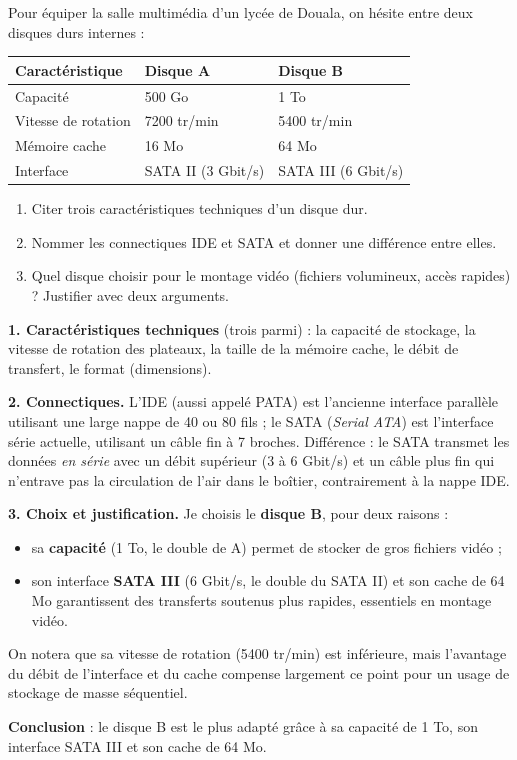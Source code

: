 \documentclass[11pt]{article}
\newcommand{\cle}[1]{{\popxbold\color{popdark}#1}}
\begin{document}
\begin{exoresolu}
Pour équiper la salle multimédia d'un lycée de Douala, on hésite entre deux disques durs internes :
\begin{center}
\begin{tabularx}{\linewidth}{|l|X|X|}
\hline
\rowcolor{popblueL} \textbf{Caractéristique} & \textbf{Disque A} & \textbf{Disque B} \\
\hline
Capacité & 500 Go & 1 To \\
\hline
Vitesse de rotation & \num{7200} tr/min & \num{5400} tr/min \\
\hline
Mémoire cache & 16 Mo & 64 Mo \\
\hline
Interface & SATA II (3 Gbit/s) & SATA III (6 Gbit/s) \\
\hline
\end{tabularx}
\end{center}
\begin{enumerate}
\item Citer trois caractéristiques techniques d'un disque dur.
\item Nommer les connectiques IDE et SATA et donner une différence entre elles.
\item Quel disque choisir pour le montage vidéo (fichiers volumineux, accès rapides) ? Justifier avec deux arguments.
\end{enumerate}
\tcblower
\textbf{1. Caractéristiques techniques} (trois parmi) : la capacité de stockage, la vitesse de rotation des plateaux, la taille de la mémoire cache, le débit de transfert, le format (dimensions).

\textbf{2. Connectiques.} L'\cle{IDE} (aussi appelé PATA) est l'ancienne interface parallèle utilisant une large nappe de 40 ou 80 fils ; le \cle{SATA} (\emph{Serial ATA}) est l'interface série actuelle, utilisant un câble fin à 7 broches. Différence : le SATA transmet les données \emph{en série} avec un débit supérieur (3 à 6 Gbit/s) et un câble plus fin qui n'entrave pas la circulation de l'air dans le boîtier, contrairement à la nappe IDE.

\textbf{3. Choix et justification.} Je choisis le \textbf{disque B}, pour deux raisons :
\begin{itemize}
\item sa \textbf{capacité} (1 To, le double de A) permet de stocker de gros fichiers vidéo ;
\item son interface \textbf{SATA III} (6 Gbit/s, le double du SATA II) et son cache de 64 Mo garantissent des transferts soutenus plus rapides, essentiels en montage vidéo.
\end{itemize}
On notera que sa vitesse de rotation (\num{5400} tr/min) est inférieure, mais l'avantage du débit de l'interface et du cache compense largement ce point pour un usage de stockage de masse séquentiel.

\textbf{Conclusion} : le disque B est le plus adapté grâce à sa capacité de 1 To, son interface SATA III et son cache de 64 Mo.
\end{exoresolu}
\end{document}
